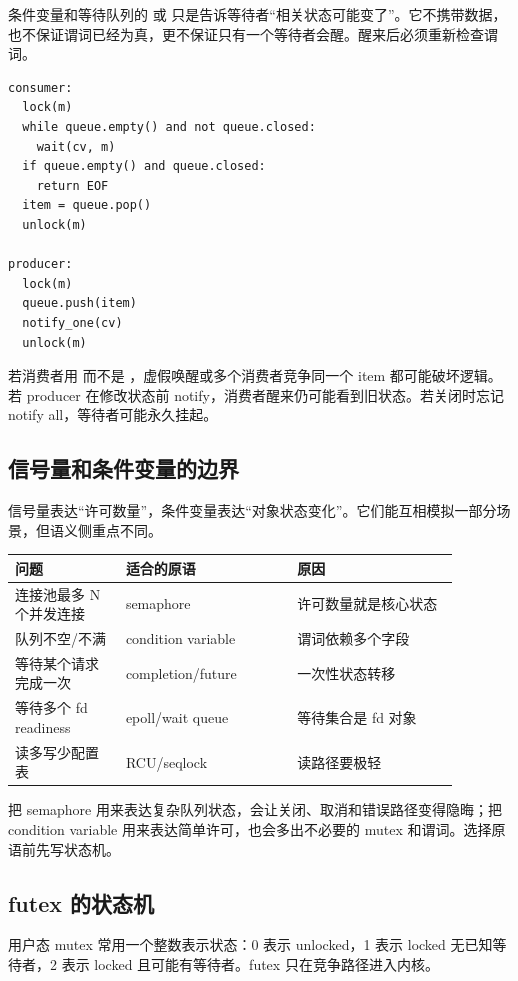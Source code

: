 条件变量和等待队列的  或  只是告诉等待者“相关状态可能变了”。它不携带数据，也不保证谓词已经为真，更不保证只有一个等待者会醒。醒来后必须重新检查谓词。

\begin{lstlisting}
consumer:
  lock(m)
  while queue.empty() and not queue.closed:
    wait(cv, m)
  if queue.empty() and queue.closed:
    return EOF
  item = queue.pop()
  unlock(m)

producer:
  lock(m)
  queue.push(item)
  notify_one(cv)
  unlock(m)
\end{lstlisting}

若消费者用  而不是 ，虚假唤醒或多个消费者竞争同一个 item 都可能破坏逻辑。若 producer 在修改状态前 notify，消费者醒来仍可能看到旧状态。若关闭时忘记 notify all，等待者可能永久挂起。

\subsection{信号量和条件变量的边界}

信号量表达“许可数量”，条件变量表达“对象状态变化”。它们能互相模拟一部分场景，但语义侧重点不同。

\begin{longtable}{|p{0.22\linewidth}|p{0.34\linewidth}|p{0.32\linewidth}|}
\toprule
问题 & 适合的原语 & 原因 \\
\midrule
连接池最多 N 个并发连接 & semaphore & 许可数量就是核心状态 \\\tablerowrule
队列不空/不满 & condition variable & 谓词依赖多个字段 \\\tablerowrule
等待某个请求完成一次 & completion/future & 一次性状态转移 \\\tablerowrule
等待多个 fd readiness & epoll/wait queue & 等待集合是 fd 对象 \\\tablerowrule
读多写少配置表 & RCU/seqlock & 读路径要极轻 \\
\bottomrule
\end{longtable}

把 semaphore 用来表达复杂队列状态，会让关闭、取消和错误路径变得隐晦；把 condition variable 用来表达简单许可，也会多出不必要的 mutex 和谓词。选择原语前先写状态机。

\subsection{futex 的状态机}

用户态 mutex 常用一个整数表示状态：0 表示 unlocked，1 表示 locked 无已知等待者，2 表示 locked 且可能有等待者。futex 只在竞争路径进入内核。

